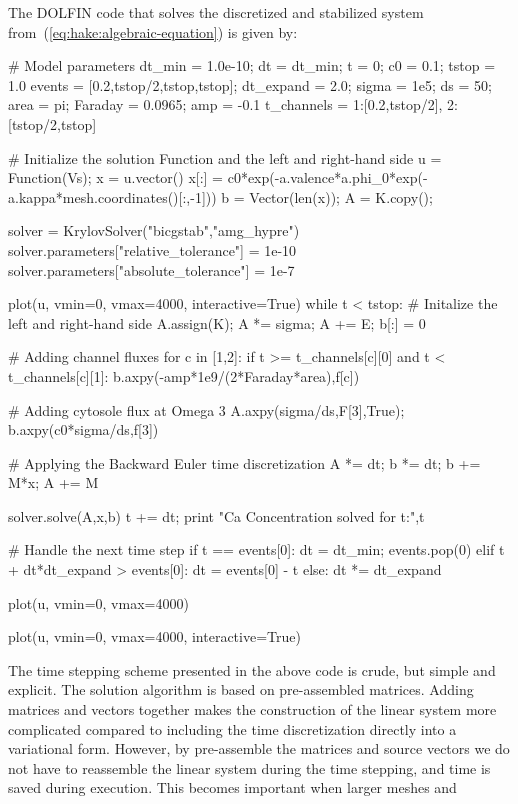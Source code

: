 The DOLFIN code that solves the discretized and stabilized system
from~(\ref{eq:hake:algebraic-equation}) is given by:
\begin{python}
# Model parameters
dt_min = 1.0e-10; dt = dt_min; t = 0; c0 = 0.1; tstop = 1.0
events = [0.2,tstop/2,tstop,tstop]; dt_expand = 2.0;
sigma = 1e5; ds = 50; area = pi; Faraday = 0.0965; amp = -0.1
t_channels = {1:[0.2,tstop/2], 2:[tstop/2,tstop]}

# Initialize the solution Function and the left and right-hand side
u = Function(Vs); x = u.vector()
x[:] = c0*exp(-a.valence*a.phi_0*exp(-a.kappa*mesh.coordinates()[:,-1]))
b = Vector(len(x)); A = K.copy();

solver = KrylovSolver("bicgstab","amg_hypre")
solver.parameters["relative_tolerance"] = 1e-10
solver.parameters["absolute_tolerance"] = 1e-7

plot(u, vmin=0, vmax=4000, interactive=True)
while t < tstop:
    # Initalize the left and right-hand side
    A.assign(K); A *= sigma; A += E; b[:] = 0

    # Adding channel fluxes
    for c in [1,2]:
        if t >= t_channels[c][0] and t < t_channels[c][1]:
            b.axpy(-amp*1e9/(2*Faraday*area),f[c])

    # Adding cytosole flux at Omega 3
    A.axpy(sigma/ds,F[3],True); b.axpy(c0*sigma/ds,f[3])

    # Applying the Backward Euler time discretization
    A *= dt; b *= dt; b += M*x; A += M

    solver.solve(A,x,b)
    t += dt; print "Ca Concentration solved for t:",t

    # Handle the next time step
    if t == events[0]:
        dt = dt_min; events.pop(0)
    elif t + dt*dt_expand > events[0]:
        dt = events[0] - t
    else:
        dt *= dt_expand

    plot(u, vmin=0, vmax=4000)

plot(u, vmin=0, vmax=4000, interactive=True)
\end{python}
The time stepping scheme presented in the above code is crude, but
simple and explicit. The solution algorithm is based on pre-assembled
matrices. Adding matrices and vectors together makes the construction
of the linear system more complicated compared to including the time
discretization directly into a variational form. However, by
pre-assemble the matrices and source vectors we do not have to
reassemble the linear system during the time stepping, and time is
saved during execution. This becomes important when larger meshes and
